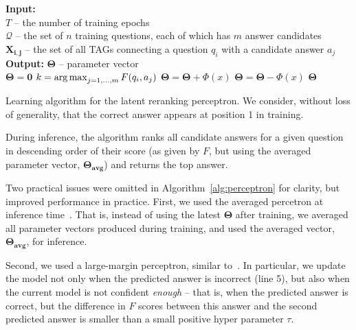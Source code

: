 \begin{algorithm}[t]                      %
\begin{singlespace}
                 \small
\begin{algorithmic}[1]                    %
    \STATE \textbf{Input:}{$ $\\
$T$ -- the number of training epochs}\\
$\boldsymbol{\mathcal{Q}}$ -- the set of $n$ training questions, each of which has $m$ answer candidates\\
$\boldsymbol{X_{i,j}}$ -- the set of all TAGs connecting a question $q_i$ with a candidate answer $a_j$\\
    \STATE \textbf{Output:}{ $\boldsymbol{\Theta}$ -- parameter vector\\}
    \STATE $\boldsymbol{\Theta} = \boldsymbol{0}$\;
			\STATE $k = \operatorname*{arg\,max}_{j = 1, \dots, m} F(q_i, a_j)$
					\STATE $\boldsymbol{\Theta} = \boldsymbol{\Theta} + \Phi(x)$
				\ENDFOR
					\STATE $\boldsymbol{\Theta} = \boldsymbol{\Theta} - \Phi(x)$
				\ENDFOR
			\ENDIF
		\ENDFOR
	\ENDFOR
	\RETURN $\boldsymbol{\Theta}$
\end{algorithmic}
\end{singlespace}
\caption{ Learning algorithm for the latent reranking perceptron. We consider, without loss of generality, that the correct answer appears at position 1 in training.}   
\label{alg:perceptron}
\end{algorithm}



{}
During inference, the algorithm ranks all candidate answers for a given question in descending order of their score (as given by $F$, but using the averaged parameter vector, $\boldsymbol{\Theta_{avg}}$) and returns the top answer.

{}
Two practical issues were omitted in Algorithm~\ref{alg:perceptron} for clarity, but improved performance in practice. First, we used the averaged percetron at inference time~\citep{Collins:2002:DTM}. That is, instead of using the latest $\boldsymbol{\Theta}$ after training, we averaged all parameter vectors produced during training, and used the averaged vector, $\boldsymbol{\Theta_{avg}}$, for inference.

Second, we used a large-margin perceptron, similar to~\citet{Surdeanu:11}. In particular, we update the model not only when the predicted answer is incorrect (line 5), but also when the current model is not confident {\em enough} -- that is, when the predicted answer is correct, but the difference in $F$ scores between this answer and the second predicted answer is smaller than a small positive hyper parameter $\tau$. 




